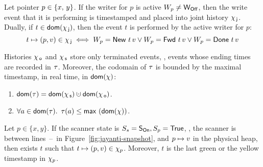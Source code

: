 
\begin{invariant}\label{inv:joint-hist}%
Let pointer $p \in \{x,\, y\}$. If the writer for $p$ is active \ie
$W_p \neq \mathsf{W_{Off}}$, then the write event that it is performing is
timestamped and placed into joint history $\chi_{\, \mathsf{j}}$. Dually, if $t \in
\mathsf{dom}(\chi_{\, \mathsf{j}})$, then the event $t$ is performed by the active writer
for $p$:
$$t \mapsto (p,v) \in \chi_{\, \mathsf{j}} \iff W_p = \mathsf{New}\ t\, v \vee
W_p = \mathsf{Fwd}\ t\, v \vee W_p = \mathsf{Done}\ t\, v $$
\end{invariant}


\begin{invariant}\label{inv:dom-tau}%
Histories $\chi_{\, \mathsf{o}}$ and $\chi_{\, \mathsf{s}}$ store only terminated events, \ie,
events whose ending times are recorded in $\tau$. Moreover, the codomain
of $\tau$ is bounded by the maximal timestamp, in real time, in
$\mathsf{dom}(\chi)$:
\begin{enumerate}
\item $\dom{\E} = \dom{\histS} \hunion \dom{\histO}$.
\item $\forall a \in \mathsf{dom}(\tau)\mathord{.}\,\ \tau(a) \leq
  \mathsf{max}\ (\mathsf{dom}(\chi))$.
\end{enumerate}
\end{invariant}



\begin{lemma}\label{lemma:first-read}%
Let $p \in \{x, y\}$. If the scanner state is $S_s= \mathsf{S_{On}}, S_p =
\mathsf{True}$, \ie, the scanner is between
lines~\lineScanReadsX--\lineScanReadsY\ in
Figure~\ref{fig:jayanti-snapshot}, and $ p \mapsto v$ in the physical
heap, then exists $t$ such that $ t \mapsto (p, v) \in
\chi_p$. Moreover, $t$
is the last green or the yellow timestamp in $\chi_p$.
\end{lemma}

